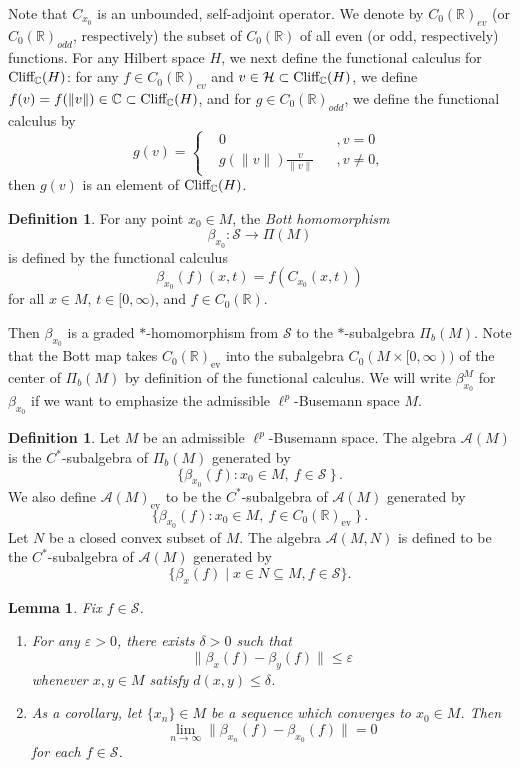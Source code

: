 \documentclass{article}
\theoremstyle{plain}
\newtheorem{lemma}[theorem]{Lemma}
\theoremstyle{definition}
\newtheorem{definition}[theorem]{Definition}
\theoremstyle{remark}
\def\A{\mathcal A}
\def\H{\mathcal H}
\def\IR{\mathbb R}
\def\IC{\mathbb C}
\def\Cl{\textup{Cliff}_{\IC}}
\def\S{\mathcal S}
\begin{document}
	Note that $C_{x_0}$ is an unbounded, self-adjoint operator. We denote by $C_0(\IR)_{ev}$ (or $C_0(\IR)_{odd}$, respectively) the subset of $C_0(\IR)$ of all even (or odd, respectively) functions. For any Hilbert space $H$, we next define the functional calculus for $\Cl(H)$: for any $f\in C_0(\IR)_{ev}$ and $v\in\H\subset\Cl(H)$, we define $f(v)=f(\|v\|)\in\IC\subset\Cl(H)$, and for $g\in C_0(\IR)_{odd}$, we define the functional calculus by
	$$g(v)=\left\{\begin{aligned}&0&&,v=0\\&g(\|v\|)\frac{v}{\|v\|}&&,v\ne0,\end{aligned}\right.$$
	then $g(v)$ is an element of $\Cl(H)$.
	\begin{definition}
		For any point $x_0\in M$, the \emph{Bott homomorphism}
		\[
		\beta_{x_0}: \S \to \Pi (M)
		\]
		is defined by the functional calculus
		\[
		\beta_{x_0}(f) (x,t) = f(C_{x_0}(x, t))
		\]
		for all $x \in M$, $t \in [0,\infty)$, and $f \in C_0(\IR)$. 
	\end{definition}
	Then $\beta_{x_0}$ is a graded $*$-homomorphism from $\S$ to the $*$-subalgebra $\Pi_b(M)$. Note that the Bott map takes $C_0(\IR)_\text{ev}$ into the subalgebra $C_0 (M \times [0,\infty))$ of the center of $\Pi_b(M)$ by definition of the functional calculus. We will write $\beta_{x_0}^M$ for $\beta_{x_0}$ if we want to emphasize the admissible $\ell^p$-Busemann space $M$. 
	
	\begin{definition}
		Let $M$ be an admissible $\ell^p$-Busemann space. The algebra $\mathcal{A}(M)$ is the $C^*$-subalgebra of $\Pi_b(M)$ generated by 
		\[
		\{ \beta_{x_0}(f) \colon x_0 \in M,\ f \in \S \ \} \, .
		\]
		We also define $ \mathcal{A}(M)_{\text{ev}} $ to be the $C^*$-subalgebra of $\mathcal{A}(M)$ generated by 
		\[
		\{ \beta_{x_0}(f) \colon x_0 \in M,\ f \in C_0(\IR)_\text{ev} \ \} \, . 
		\]
		Let $N$ be a closed convex subset of $M$. The algebra $\mathcal{A}(M,N)$ is defined to be the $C^*$-subalgebra of $\A(M)$ generated by
		$$\{\beta_x(f)\mid x\in N\subseteq M,f\in \S\}.$$
	\end{definition}
	
	\begin{lemma}\label{continuousBott}
		Fix $f\in\S$.\begin{enumerate}
			\item[(1)] For any $\varepsilon>0$, there exists $\delta>0$ such that
			$$\|\beta_x(f)-\beta_y(f)\|\leq\varepsilon$$
			whenever $x,y\in M$ satisfy $d(x,y)\leq\delta$.
			\item[(2)] As a corollary, let $\{x_n\}\in M$ be a sequence which converges to $x_0\in M$. Then
			$$\lim_{n\to\infty}\|\beta_{x_n}(f)-\beta_{x_0}(f)\|=0$$
			for each $f\in \S$.
		\end{enumerate}
	\end{lemma}
	
\end{document}
